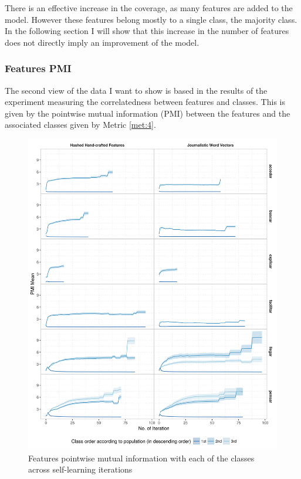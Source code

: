 There is an effective increase in the coverage, as many features are added to
the model. However these features belong mostly to a single class, the majority
class. In the following section I will show that this increase in the number
of features does not directly imply an improvement of the model.

\subsubsection{Features PMI}\label{sec:self-learning:featurespmi}

The second view of the data I want to show is based in the results of the
experiment measuring the correlatedness between features and classes. This is
given by the pointwise mutual information (PMI) between the features and the
associated classes given by Metric \ref{met:4}.

\begin{figure}[htb!]
  \centering
  \includegraphics[height=.9\textheight,width=\textwidth,keepaspectratio]
    {plots/selflearning/features_pmi}
  \caption{Features pointwise mutual information with each of the classes
  across self-learning iterations}
  \label{fig:self-learning:pmi}
\end{figure}

